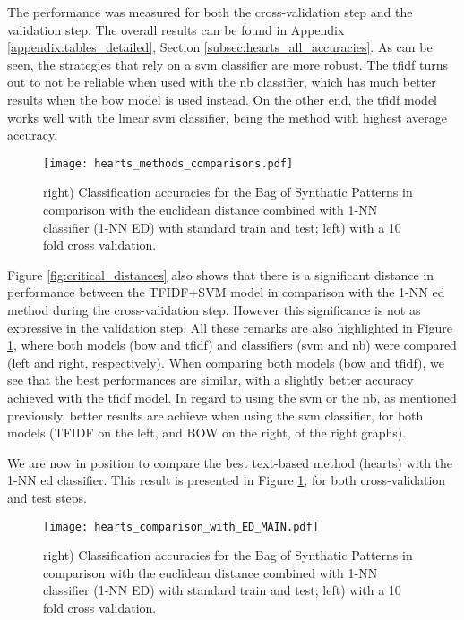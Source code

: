 The performance was measured for both the cross-validation step and the validation step. The overall results can be found in Appendix \ref{appendix:tables_detailed}, Section \ref{subsec:hearts_all_accuracies}. As can be seen, the strategies that rely on a \gls{svm} classifier are more robust. The \gls{tfidf} turns out to not be reliable when used with the \gls{nb} classifier, which has much better results when the \gls{bow} model is used instead. On the other end, the \gls{tfidf} model works well with the linear \gls{svm} classifier, being the method with highest average accuracy.

\begin{figure}
    \centering
    \texttt{[image: hearts\_methods\_comparisons.pdf]}
    \caption{right) Classification accuracies for the Bag of Synthatic Patterns in comparison with the euclidean distance combined with 1-NN classifier (1-NN ED) with standard train and test; left) with a 10 fold cross validation.}
    \label{fig:comparison_2}
\end{figure}

Figure \ref{fig:critical_distances} also shows that there is a significant distance in performance between the TFIDF+SVM model in comparison with the 1-NN \gls{ed} method during the cross-validation step. However this significance is not as expressive in the validation step. All these remarks are also highlighted in Figure \ref{fig:comparison_2}, where both models (\gls{bow} and \gls{tfidf}) and classifiers (\gls{svm} and \gls{nb}) were compared (left and right, respectively).  When comparing both models (\gls{bow} and \gls{tfidf}), we see that the best performances are similar, with a slightly better accuracy achieved with the \gls{tfidf} model. In regard to using the \gls{svm} or the \gls{nb}, as mentioned previously, better results are achieve when using the \gls{svm} classifier, for both models (TFIDF on the left, and BOW on the right, of the right graphs).

We are now in position to compare the best text-based method (\gls{hearts}) with the 1-NN \gls{ed} classifier. This result is presented in Figure \ref{fig:comparison_2}, for both cross-validation and test steps.

\begin{figure}
    \centering
    \texttt{[image: hearts\_comparison\_with\_ED\_MAIN.pdf]}
    \caption{right) Classification accuracies for the Bag of Synthatic Patterns in comparison with the euclidean distance combined with 1-NN classifier (1-NN ED) with standard train and test; left) with a 10 fold cross validation.}
    \label{fig:ed_comparison}
\end{figure}

